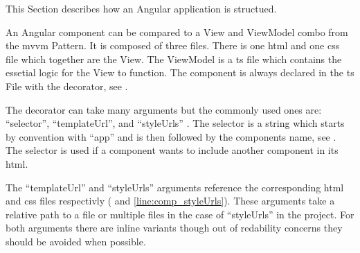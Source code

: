 

This Section describes how an Angular application is structued.


An Angular component can be compared to a View and ViewModel combo from the \gls{mvvm} Pattern. It is composed of three files. There is one \gls{html} and one \gls{css} file which together are the View. The ViewModel is a \gls{ts} file which contains the essetial logic for the View to function. The component is always declared in the \gls{ts} File with the  decorator, see .


The  decorator can take many arguments but the commonly used ones are: \enquote{selector}, \enquote{templateUrl}, and \enquote{styleUrls} \cite{ngcomponent}. The selector is a string which starts by convention with \enquote{app} and is then followed by the components name, see . The selector is used if a component wants to include another component in its \gls{html}.

The \enquote{templateUrl} and \enquote{styleUrls} arguments reference the corresponding \gls{html} and \gls{css} files respectivly ( and \ref{line:comp_styleUrls}). These arguments take a relative path to a file or multiple files in the case of \enquote{styleUrls} in the project. For both arguments there are inline variants though out of redability concerns they should be avoided when possible.




